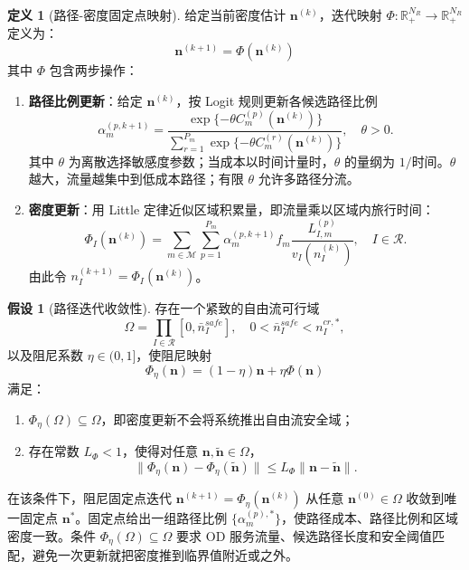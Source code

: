 \documentclass[a4paper,12pt]{article}
\theoremstyle{plain}
\theoremstyle{definition}
\newtheorem{definition}[theorem]{定义}
\newtheorem{assumption}[theorem]{假设}
\theoremstyle{remark}
\begin{document}
\begin{definition}[路径-密度固定点映射]\label{def:fixed_point}
给定当前密度估计 $\bm{n}^{(k)}$，迭代映射 $\Phi: \mathbb{R}_{+}^{N_R} \to \mathbb{R}_{+}^{N_R}$ 定义为：
\begin{equation}\label{eq:fixed_point_map}
    \bm{n}^{(k+1)} = \Phi(\bm{n}^{(k)})
\end{equation}
其中 $\Phi$ 包含两步操作：
\begin{enumerate}
    \item \textbf{路径比例更新}：给定 $\bm{n}^{(k)}$，按 Logit 规则更新各候选路径比例
    \begin{equation}\label{eq:logit_update}
        \alpha_m^{(p,k+1)}
        =
        \frac{\exp\{-\theta C_m^{(p)}(\bm n^{(k)})\}}
        {\sum_{r=1}^{P_m}\exp\{-\theta C_m^{(r)}(\bm n^{(k)})\}},
        \quad \theta>0 .
    \end{equation}
其中 $\theta$ 为离散选择敏感度参数；当成本以时间计量时，$\theta$ 的量纲为 $1/\text{时间}$。$\theta$ 越大，流量越集中到低成本路径；有限 $\theta$ 允许多路径分流。
    \item \textbf{密度更新}：用 Little 定律近似区域积累量，即流量乘以区域内旅行时间：
    \begin{equation}\label{eq:density_update}
        \Phi_I(\bm n^{(k)})
        =
        \sum_{m\in\mathcal M}\sum_{p=1}^{P_m}
        \alpha_m^{(p,k+1)} f_m
        \frac{L_{I,m}^{(p)}}{v_I(n_I^{(k)})},
        \quad I\in\mathcal R .
    \end{equation}
    由此令 $n_I^{(k+1)}=\Phi_I(\bm n^{(k)})$。
\end{enumerate}
\end{definition}

\begin{assumption}[路径迭代收敛性]\label{asm:path_convergence}
存在一个紧致的自由流可行域
\begin{equation}
    \Omega=\prod_{I\in\mathcal R}[0,\bar n_I^{safe}],
    \quad 0<\bar n_I^{safe}<n_I^{cr,*},
\end{equation}
以及阻尼系数 $\eta\in(0,1]$，使阻尼映射
\begin{equation}\label{eq:damped_fixed_point}
    \Phi_\eta(\bm n)=(1-\eta)\bm n+\eta\Phi(\bm n)
\end{equation}
满足：
\begin{enumerate}
    \item $\Phi_\eta(\Omega)\subseteq\Omega$，即密度更新不会将系统推出自由流安全域；
    \item 存在常数 $L_\Phi<1$，使得对任意 $\bm n,\tilde{\bm n}\in\Omega$，
    \begin{equation}
        \|\Phi_\eta(\bm n)-\Phi_\eta(\tilde{\bm n})\|\le L_\Phi\|\bm n-\tilde{\bm n}\|.
    \end{equation}
\end{enumerate}
在该条件下，阻尼固定点迭代 $\bm n^{(k+1)}=\Phi_\eta(\bm n^{(k)})$ 从任意 $\bm n^{(0)}\in\Omega$ 收敛到唯一固定点 $\bm n^*$。固定点给出一组路径比例 $\{\alpha_m^{(p),*}\}$，使路径成本、路径比例和区域密度一致。条件 $\Phi_\eta(\Omega)\subseteq\Omega$ 要求 OD 服务流量、候选路径长度和安全阈值匹配，避免一次更新就把密度推到临界值附近或之外。
\end{assumption}
\end{document}

